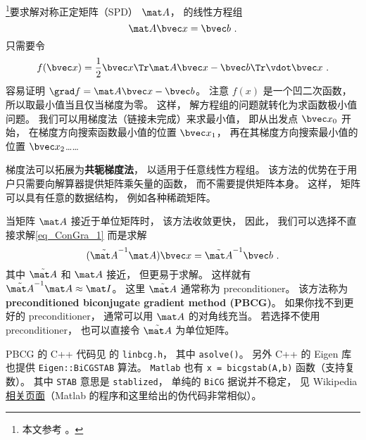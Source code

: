 
\begin{issues}
\issueDraft
\end{issues}


\footnote{本文参考 \cite{NR3}。}要求解对称正定矩阵（SPD） $\mat A$， 的线性方程组
\begin{equation}\label{eq_ConGra_1}
\mat A \bvec x = \bvec b~.
\end{equation}
只需要令
\begin{equation}
f(\bvec x) = \frac{1}{2}\bvec x\Tr \mat A\bvec x - \bvec b\Tr \vdot \bvec x~.
\end{equation}
容易证明 $\grad f = \mat A \bvec x - \bvec b$。 注意 $f(x)$ 是一个凹二次函数， 所以取最小值当且仅当梯度为零。 这样， 解方程组的问题就转化为求函数极小值问题。 我们可以用梯度法（链接未完成）来求最小值， 即从出发点 $\bvec x_0$ 开始， 在梯度方向搜索函数最小值的位置 $\bvec x_1$， 再在其梯度方向搜索最小值的位置 $\bvec x_2$……

梯度法可以拓展为\textbf{共轭梯度法}， 以适用于任意线性方程组。 该方法的优势在于用户只需要向解算器提供矩阵乘矢量的函数， 而不需要提供矩阵本身。 这样， 矩阵可以具有任意的数据结构， 例如各种稀疏矩阵。

当矩阵 $\mat A$ 接近于单位矩阵时， 该方法收敛更快， 因此， 我们可以选择不直接求解\autoref{eq_ConGra_1} 而是求解
\begin{equation}
(\tilde {\mat A}^{-1}\mat A) \bvec x = \tilde {\mat A}^{-1}\bvec b~.
\end{equation}
其中 $\tilde {\mat A}$ 和 $\mat A$ 接近， 但更易于求解。 这样就有 $\tilde {\mat A}^{-1}\mat A \approx \mat I$。 这里 $\tilde {\mat A}$ 通常称为 preconditioner。 该方法称为 \textbf{preconditioned biconjugate gradient method (PBCG)}。 如果你找不到更好的 preconditioner， 通常可以用 $\mat A$ 的对角线充当。 若选择不使用 preconditioner， 也可以直接令 $\tilde {\mat A}$ 为单位矩阵。

PBCG 的 C++ 代码见 \cite{NR3} 的 \verb|linbcg.h|， 其中 \verb|asolve()|。 另外 C++ 的 Eigen 库也提供 \verb|Eigen::BiCGSTAB| 算法。 \verb|Matlab| 也有 \verb|x = bicgstab(A,b)| 函数（支持复数）。 其中 \verb|STAB| 意思是 \verb|stablized|， 单纯的 \verb|BiCG| 据说并不稳定， 见 Wikipedia \href{https://en.wikipedia.org/wiki/Biconjugate_gradient_stabilized_method}{相关页面}（Matlab 的程序和这里给出的伪代码非常相似）。
